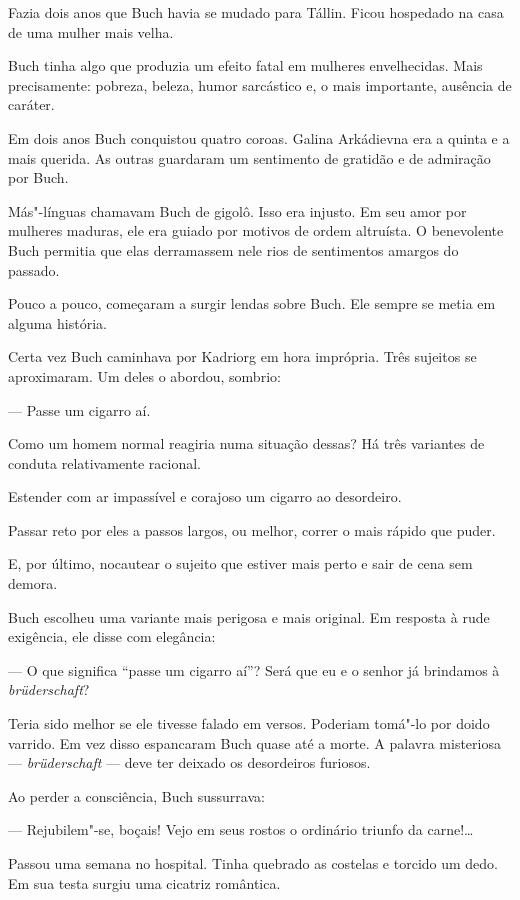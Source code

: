 Fazia dois anos que Buch havia se mudado para Tállin. Ficou hospedado na
casa de uma mulher mais velha.

Buch tinha algo que produzia um efeito fatal em mulheres envelhecidas.
Mais precisamente: pobreza, beleza, humor sarcástico e, o mais
importante, ausência de caráter.

Em dois anos Buch conquistou quatro coroas. Galina Arkádievna era a
quinta e a mais querida. As outras guardaram um sentimento de gratidão e
de admiração por Buch.

Más"-línguas chamavam Buch de gigolô. Isso era injusto. Em seu amor por
mulheres maduras, ele era guiado por motivos de ordem altruísta. O
benevolente Buch permitia que elas derramassem nele rios de sentimentos
amargos do passado.

Pouco a pouco, começaram a surgir lendas sobre Buch. Ele sempre se metia
em alguma história.

Certa vez Buch caminhava por Kadriorg em hora imprópria. Três sujeitos
se aproximaram. Um deles o abordou, sombrio:

--- Passe um cigarro aí.

Como um homem normal reagiria numa situação dessas? Há três variantes de
conduta relativamente racional.

Estender com ar impassível e corajoso um cigarro ao desordeiro.

Passar reto por eles a passos largos, ou melhor, correr o mais rápido
que puder.

E, por último, nocautear o sujeito que estiver mais perto e sair de cena
sem demora.

Buch escolheu uma variante mais perigosa e mais original. Em resposta à
rude exigência, ele disse com elegância:

--- O que significa ``passe um cigarro aí''? Será que eu e o senhor já
brindamos à \emph{brüderschaft}?

Teria sido melhor se ele tivesse falado em versos. Poderiam tomá"-lo por
doido varrido. Em vez disso espancaram Buch quase até a morte. A palavra
misteriosa --- \emph{brüderschaft} --- deve ter deixado os desordeiros
furiosos.

Ao perder a consciência, Buch sussurrava:

--- Rejubilem"-se, boçais! Vejo em seus rostos o ordinário triunfo da
carne!\ldots{}

Passou uma semana no hospital. Tinha quebrado as costelas e torcido um
dedo. Em sua testa surgiu uma cicatriz romântica.

